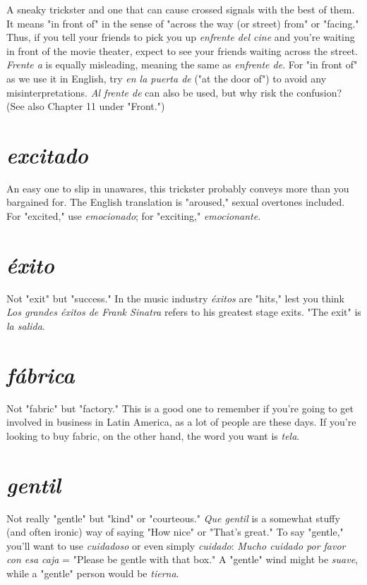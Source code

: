 \documentclass[14pt,a4paper,oneside]{memoir}
\begin{document}
A sneaky trickster and one that can cause
crossed signals with the best of them. It means "in front of" in the
sense of "across the way (or street) from" or "facing." Thus, if you tell
your friends to pick you up \emph{enfrente del cine} and you're waiting in
front of the movie theater, expect to see your friends waiting across
the street. \emph{Frente a} is equally misleading, meaning the same as \emph{enfrente de}. For "in front of" as we use it in English, try \emph{en la puerta de}
("at the door of") to avoid any misinterpretations. \emph{Al frente de} can also
be used, but why risk the confusion? (See also Chapter 11 under
"Front.")

\section{\emph{excitado}}

An easy one to slip in unawares, this trickster
probably conveys more than you bargained for. The English translation
is "aroused," sexual overtones included. For "excited," use \emph{emocionado}; for "exciting," \emph{emocionante}.

\section{\emph{éxito}}

Not "exit" but "success." In the music industry \emph{éxitos}
are "hits," lest you think \emph{Los grandes éxitos de Frank Sinatra} refers to
his greatest stage exits. "The exit" is \emph{la salida}.

\section{\emph{fábrica}}

Not "fabric" but "factory." This is a good one to remember if you're going to get involved in business in Latin America, as
a lot of people are these days. If you're looking to buy fabric, on the
other hand, the word you want is \emph{tela}.

\section{\emph{gentil}}

Not really "gentle" but "kind" or "courteous." \emph{Que
gentil} is a somewhat stuffy (and often ironic) way of saying "How
nice" or "That's great." To say "gentle," you'll want to use \emph{cuidadoso}
or even simply \emph{cuidado}: \emph{Mucho cuidado por favor con esa caja} =
"Please be gentle with that box." A "gentle" wind might be \emph{suave},
while a "gentle" person would be \emph{tierna}.
\end{document}
